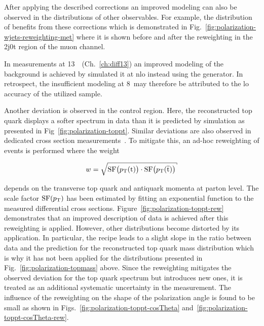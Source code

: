 After applying the described \wjets corrections an improved modeling can also be observed in the distributions of other observables. For example, the distribution of \met benefits from these corrections which is demonstrated in Fig.~\ref{fig:polarization-wjets-reweighting-met} where it is shown before and after the reweighting in the 2j0t region of the muon channel.


In measurements at 13~\TeV~(Ch.~\ref{ch:diff13}) an improved modeling of the \wjets background is achieved by simulated it at \gls{nlo} instead using the \MGAMC generator. In retrospect, the insufficient modeling at 8~\TeV may therefore be attributed to the \gls{lo} accuracy of the utilized \MG \wjets sample.

Another deviation is observed in the \ttbar control region. Here, the reconstructed top quark \pt displays a softer spectrum in data than it is predicted by simulation as presented in Fig~\ref{fig:polarization-toppt}. Similar deviations are also observed in dedicated \ttbar cross section measurements~\cite{Chatrchyan:2012saa,Khachatryan:2015oqa}. To mitigate this, an ad-hoc reweighting of \ttbar events is performed where the weight

\begin{equation}
w=\sqrt{\mathrm{SF}\big(\pt(\mathrm{t})\big)\cdot\mathrm{SF}\big(\pt(\bar{\mathrm{t}})\big)}
\end{equation} 

depends on the transverse top quark and antiquark momenta at parton level. The scale factor $\mathrm{SF}(p_\textrm{T})$ has been estimated by fitting an exponential function to the measured differential \ttbar cross sections. Figure~\ref{fig:polarization-toppt-rew} demonstrates that an improved description of data is achieved after this reweighting is applied. However, other distributions become distorted by its application. In particular, the recipe leads to a slight slope in the ratio between data and the prediction for the reconstructed top quark mass distribution which is why it has not been applied for the distributions presented in Fig.~\ref{fig:polarization-topmass} above. Since the reweighting mitigates the observed deviation for the top quark \pt spectrum but introduces new ones, it is treated as an additional systematic uncertainty in the measurement. The influence of the reweighting on the shape of the polarization angle is found to be small as shown in Figs.~\ref{fig:polarization-toppt-cosTheta} and~\ref{fig:polarization-toppt-cosTheta-rew}.

